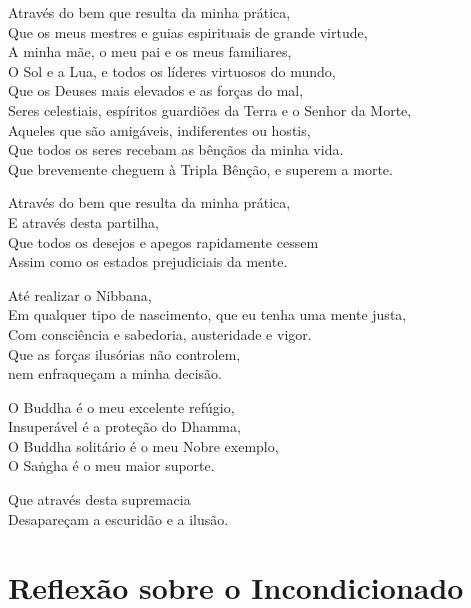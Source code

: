 \enlargethispage{2\baselineskip}

\begin{leader}
\end{leader}


Através do bem que resulta da minha prática,\\
Que os meus mestres e guias espirituais de grande virtude,\\
A minha mãe, o meu pai e os meus familiares,\\
O Sol e a Lua, e todos os líderes virtuosos do mundo,\\
Que os Deuses mais elevados e as forças do mal,\\
Seres celestiais, espíritos guardiões da Terra e o Senhor da Morte,\\
Aqueles que são amigáveis, indiferentes ou hostis,\\
Que todos os seres recebam as bênçãos da minha vida.\\
Que brevemente cheguem à Tripla Bênção, e superem a morte.

Através do bem que resulta da minha prática,\\
E através desta partilha,\\
Que todos os desejos e apegos rapidamente cessem\\
Assim como os estados prejudiciais da mente.

Até realizar o Nibbana,\\
Em qualquer tipo de nascimento, que eu tenha uma mente justa,\\
Com consciência e sabedoria, austeridade e vigor.\\
Que as forças ilusórias não controlem,\\
nem enfraqueçam a minha decisão.

O Buddha é o meu excelente refúgio,\\
Insuperável é a proteção do Dhamma,\\
O Buddha solitário é o meu Nobre exemplo,\\
O Saṅgha é o meu maior suporte.

Que através desta supremacia\\
Desapareçam a escuridão e a ilusão.

\clearpage

\chapter[Incondicionado]{Reflexão sobre o Incondicionado}


